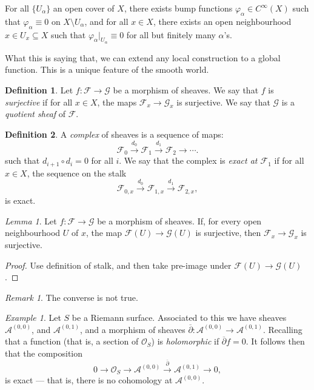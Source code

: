 \documentclass[a4paper]{report}
\theoremstyle{definition}
\newtheorem{definition}{Definition}
\theoremstyle{remark}
\newtheorem{remark}{Remark}
\theoremstyle{proposition}
\theoremstyle{conjecture}
\theoremstyle{lemma}
\newtheorem{lemma}{Lemma}
\theoremstyle{corollary}
\theoremstyle{exercise}
\theoremstyle{example}
\newtheorem{example}{Example}
\newcommand{\mcal}{\mathcal}
\begin{document}
\begin{theorem}
    For all $\lbrace U_\alpha \rbrace$ an open cover of $X$, there exists 
    bump functions $\varphi_\alpha \in C^\infty(X)$ such that 
    $\varphi_\alpha \equiv 0$ on $X\setminus U_\alpha$, 
    and for all $x\in X$, there exists an open neighbourhood $x \in U_x\subseteq X$ such that $\varphi_\alpha\vert_{U_\alpha} \equiv 0$ for all 
    but finitely many $\alpha$'s.
\end{theorem}

What this is saying that, we can extend any local construction to a global
function. This is a unique feature of the smooth world.

\begin{definition}
    Let $f : \mcal{F} \to \mcal{G}$ be a morphism of sheaves. 
    We say that $f$ is \emph{surjective} if for all $x\in X$, 
    the maps $\mcal{F}_x\to\mcal{G}_x$ is surjective.
    We say that $\mcal{G}$ is a \emph{quotient sheaf} of $\mcal{F}$. 
\end{definition}

\begin{definition}
    A \emph{complex} of sheaves is a sequence of maps:
    $$\mcal{F}_0 \stackrel{d_0}{\longrightarrow} \mcal{F}_1\stackrel{d_1}{\longrightarrow} \mcal{F}_2 \longrightarrow\cdots.$$
    such that $d_{i+1}\circ d_i = 0$ for all $i$. We say that 
    the complex is \emph{exact at $\mcal{F}_1$} if for all $x\in X$,
    the sequence on the stalk $$\mcal{F}_{0,x} \stackrel{d_0}{\longrightarrow} \mcal{F}_{1,x}\stackrel{d_1}{\longrightarrow} \mcal{F}_{2,x},$$
    is exact.
\end{definition}

\begin{lemma}
    Let $f: \mcal{F} \to \mcal{G}$ be a morphism of sheaves.
    If, for every open neighbourhood $U$ of $x$, the map
    $\mcal{F}(U) \to \mcal{G}(U)$ is surjective, then 
    $\mcal{F}_x \to \mcal{G}_x$ is surjective.
\end{lemma}

\begin{proof}
    Use definition of stalk, and then take pre-image under 
    $\mcal{F}(U)\to\mcal{G}(U)$.
\end{proof}

\begin{remark}
    The converse is not true.
\end{remark}

\begin{example}
    Let $S$ be a Riemann surface. Associated to this we have 
    sheaves $\mcal{A}^{(0,0)}$, and $\mcal{A}^{(0,1)}$, and a 
    morphism of sheaves 
    $\overline{\partial} : \mcal{A}^{(0,0)} \to \mcal{A}^{(0,1)}$. 
    Recalling that a function (that is, a section of $\mcal{O}_S$) 
    is \emph{holomorphic} if $\overline{\partial}f = 0$. It follows
    then that the composition
    $$0\longrightarrow \mcal{O}_S \longrightarrow \mcal{A}^{(0,0)} \stackrel{\overline{\partial}}{\longrightarrow}\mcal{A}^{(0,1)}\longrightarrow 0,$$
    is exact --- that is, there is no cohomology at 
    $\mcal{A}^{(0,0)}$.
\end{example}
\end{document}
